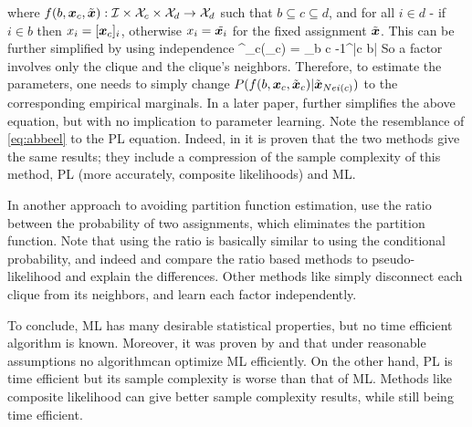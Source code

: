 {{\ee
{}
where  $f(b,\boldsymbol{x}_c,\tilde{\boldsymbol{x}}) : {\cal I} \times {\cal X}_c \times {\cal X}_d\to {\cal X}_d$ such that $b \subseteq c\subseteq d$, and for all $i \in d$ - if $i \in b$ then $x_i = [\boldsymbol{x}_c]_i$, otherwise $x_i = \tilde{\boldsymbol{x}_i}$ for the fixed assignment $\tilde{\boldsymbol{x}}$.
This can be further simplified by using independence 
\be
\label{eq:abbeel}
\thetav^{\dagger}_{c}(\xx_c) = \sum_{b \subseteq c} -1^{|c \setminus b|} 
\ee
So a factor involves only the clique and the clique's neighbors.
Therefore, to estimate the parameters, one needs to simply change $P(f(b,\boldsymbol{x}_c,\tilde{\boldsymbol{x}}_c) |\tilde{\boldsymbol{x}}_{Nei(c)})$ to the corresponding empirical marginals.
In a later paper, \cite{roy2009learning} further simplifies the above equation, but with no implication to parameter learning.
Note the resemblance of  \eqref{eq:abbeel} to the PL equation.
}
Indeed, in \cite{bradley2012sample} it is proven that the two methods give the same results;
they include a compression of the sample complexity of this method, PL (more accurately, composite likelihoods) and ML.
}

In another approach to avoiding partition function estimation, \cite{hyvarinen2007some} use the ratio between the probability of two assignments, which eliminates the partition function.
Note that using the ratio is basically similar to using the conditional probability, and indeed \cite{marlin2010inductive} and \cite{marlin2012asymptotic} compare the ratio based  methods to pseudo-likelihood and explain the differences.
Other methods like \cite{mizrahi2014icml} simply disconnect each clique from its neighbors, and learn each factor independently.

To conclude, ML has many desirable statistical properties, but no time efficient algorithm is known. Moreover, it was proven by \cite{bresler2014hardness} and \cite{montanari2015computational} that under reasonable assumptions no algorithmcan optimize ML efficiently. On the other hand, PL is time efficient but its sample complexity is worse than that of ML. Methods like composite likelihood can give better sample complexity results, while still being time efficient.

